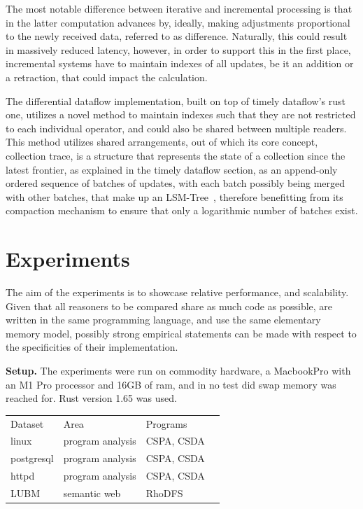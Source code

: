 \documentclass[sigconf,screen,review,natbib]{acmart}
\theoremstyle{definition}
\begin{document}
The most notable difference between iterative and incremental processing is that in the latter computation advances by, ideally, making adjustments proportional to the newly
received data, referred to as difference. Naturally, this could result in massively reduced latency, however, in order to support this in the first place, incremental
systems have to maintain indexes of all updates, be it an addition or a retraction, that could impact the calculation.

The differential dataflow implementation, built on top of timely dataflow's rust one, utilizes a novel method to maintain indexes such that they are not restricted
to each individual operator, and could also be shared between multiple readers. This method utilizes shared arrangements, out of which its core concept, collection
trace, is a structure that represents the state of a collection since the latest frontier, as explained in the timely dataflow section, as an append-only ordered sequence
of batches of updates, with each batch possibly being merged with other batches, that make up an LSM-Tree~\cite{lsm}, therefore benefitting from its compaction mechanism
to ensure that only a logarithmic number of batches exist.

\section{Experiments}

The aim of the experiments is to showcase relative performance, and scalability. Given that all reasoners to be compared share as much code as possible, are written in the same
programming language, and use the same elementary memory model, possibly strong empirical statements can be made with respect to the specificities of their implementation.

\textbf{Setup.} The experiments were run on commodity hardware, a MacbookPro with an M1 Pro processor and 16GB of ram, and in no test did swap memory was reached for.
Rust version 1.65 was used.

\begin{table}[]
	\begin{tabular}{llll}
		Dataset    & Area             & Programs   \\
		linux      & program analysis & CSPA, CSDA \\
		postgresql & program analysis & CSPA, CSDA \\
		httpd      & program analysis & CSPA, CSDA \\
		LUBM       & semantic web     & RhoDFS
	\end{tabular}
	\label{table:datasets}
\end{table}
\end{document}
